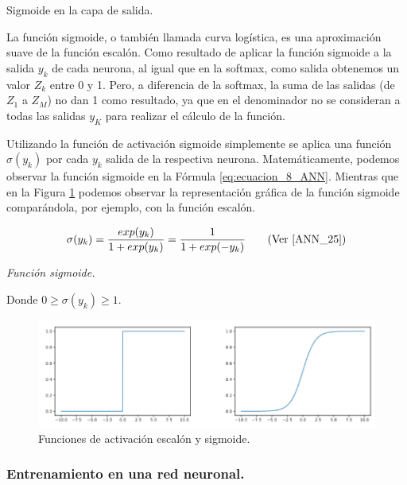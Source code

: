 \documentclass[12pt,a4paper]{article}
\makeatletter
\renewcommand\paragraph{\@startsection{paragraph}{4}{\z@}
            {-2.5ex\@plus -1ex \@minus -.25ex}
            {1.25ex \@plus .25ex}
            {\normalfont\normalsize\bfseries}}
\makeatother
\begin{document}
\begin{sloppypar}
\paragraph{Sigmoide en la capa de salida.}\label{sigm_capa_salida}

La función sigmoide, o también llamada curva logística, es una aproximación suave de la función escalón. Como resultado de aplicar la función sigmoide a la salida $y_k$ de cada neurona, al igual que en la softmax, como salida obtenemos un valor $Z_k$ entre 0 y 1. Pero, a diferencia de la softmax, la suma de las salidas (de $Z_1$ a $Z_M$) no dan 1 como resultado, ya que en el denominador no se consideran a todas las salidas $y_K$ para realizar el cálculo de la función. 

Utilizando la función de activación sigmoide simplemente se aplica una función $\sigma(y_k)$ por cada $y_k$ salida de la respectiva neurona. Matemáticamente, podemos observar la función sigmoide en la Fórmula \ref{eq:ecuacion_8_ANN}. 
Mientras que en la Figura \ref{fig:ann_5} podemos observar la representación gráfica de la función sigmoide comparándola, por ejemplo, con la función escalón. 

\begin{equation}\label{eq:ecuacion_8_ANN}
\sigma(y_k)= \frac{exp(y_k)}{ {1 + exp(y_k)}} =  \frac{1}{ {1+exp(-y_k)}}    \qquad \text{(Ver \cite{ANN_25})}
\end{equation}
\begin{center}
\textit{Función sigmoide.}
\end{center}

Donde $0 \geq \sigma(y_k) \geq 1$.    

\begin{figure}[H]    %
 \centering
 \includegraphics[width=1\textwidth]{images/ANN/5-ANN.png}
 \caption{Funciones de activación escalón y sigmoide\cite{ANN_25}.} 
 \label{fig:ann_5}
\end{figure}

\subsubsection{Entrenamiento en una red neuronal.}\label{entren_ann}


\end{sloppypar}
\end{document}
